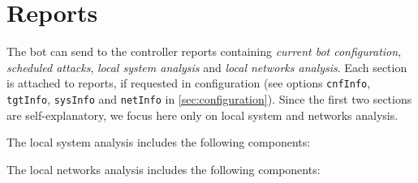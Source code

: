 \section{Reports}
\label{sec:reports}

The bot can send to the controller reports containing \textit{current bot configuration}, \textit{scheduled attacks}, \textit{local system analysis} and \textit{local networks analysis}. Each section is attached to reports, if requested in configuration (see options \texttt{cnfInfo}, \texttt{tgtInfo}, \texttt{sysInfo} and \texttt{netInfo} in \ref{sec:configuration}). Since the first two sections are self-explanatory, we focus here only on local system and networks analysis.

The local system analysis includes the following components:

\begin{description}
  \setlength\itemsep{1em}
  \item[SYSTEM-ITEM-1] \textcolor{green}{\lipsum[1]}
\end{description}

The local networks analysis includes the following components:

\begin{description}
  \setlength\itemsep{1em}
  \item[NETWORK-ITEM-1] \textcolor{green}{\lipsum[1]}
\end{description}
